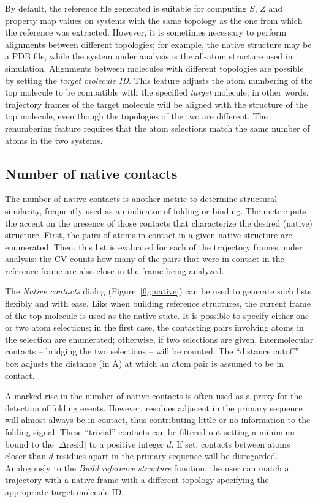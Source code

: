 \documentclass[preprint,review,11pt]{elsarticle}
\begin{document}
By default, the reference file generated is suitable for computing
$S$, $Z$ and property map values on systems with the same topology as the
one from which the reference was extracted.  However, it is sometimes
necessary to perform alignments between different topologies; for example, the
native structure may be a PDB file, while the system
under analysis is the all-atom structure used in
simulation. Alignments between molecules with different topologies are
possible by setting the \emph{target molecule ID}. This feature adjusts
the atom numbering of the top molecule to be compatible with the
specified \emph{target} molecule; in other words, trajectory frames of
the target molecule will be aligned with the structure of the top
molecule, even though the topologies of the two are different. The
renumbering feature requires that the atom selections match the same
number of atoms in the two systems.





\subsection{Number of native contacts}

The number of native contacts is another metric  to
determine structural similarity, frequently used as an indicator of folding
or binding.  The metric puts the accent on the presence of those
contacts that characterize the desired (native) structure. First, the
pairs of atoms in contact in a given native structure are
enumerated. Then, this list is evaluated
for each of the trajectory frames under analysis: the 
CV counts how many of the pairs that were in contact in the
reference frame are also close in the frame being analyzed.  

The \emph{Native contacts} dialog (Figure~\ref{fig:native}) can be
used to generate such lists flexibly and with ease. Like when building
reference structures, the current frame of the top molecule is used as
the native state.  It is possible to specify either one or two atom
selections; in the first case, the contacting pairs involving atoms in
the selection are enumerated; otherwise, if two selections are given,
intermolecular contacts -- bridging the two selections -- will be
counted.  The ``distance cutoff'' box adjusts the distance (in \AA) at
which an atom pair is assumed to be in contact.

A marked rise in the number of native contacts is often used as a
proxy for the detection of folding events. However, residues adjacent
in the primary sequence will almost always be in contact, thus
contributing little or no information to the folding signal. These
``trivial'' contacts can be filtered out setting a minimum bound to
the $| \Delta \mbox{resid} |$ to a positive integer $d$. If set,
contacts between atoms closer than $d$ residues apart in the
primary sequence will be disregarded.
Analogously to the \emph{Build reference structure} function, the user
can match a trajectory with a native frame with a different topology
specifying the appropriate target molecule ID.
\end{document}
